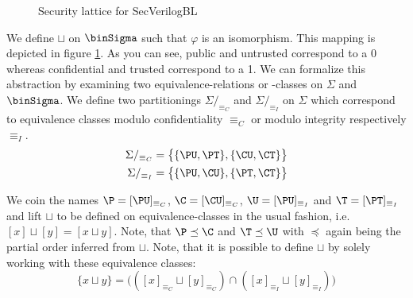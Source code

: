 \begin{figure}
    \centering
    \caption{Security lattice for SecVerilogBL \cite{Ferraiuolo17}}
    \label{fig:sec-lattice}
\end{figure}

We define $ \sqcup $ on $ \binSigma $ such that $ \varphi $ is an isomorphism.
This mapping is depicted in figure \ref{fig:sec-lattice}.
As you can see, public and untrusted correspond to a 0 whereas confidential and trusted correspond to a 1.
We can formalize this abstraction by examining two equivalence-relations or -classes on $ \Sigma $ and $ \binSigma $.
We define two partitionings $ \Sigma/_{\equiv_C} $ and $ \Sigma/_{\equiv_I} $ on $ \Sigma $ which correspond to equivalence classes modulo confidentiality $ \equiv_C $ or modulo integrity respectively $ \equiv_I $.
\begin{align*}
    \Sigma /_{\equiv_C} &= \big\{ \{ \PU, \PT \}, \{ \CU, \CT \} \big\} \\
    \Sigma /_{\equiv_I} &= \big\{ \{ \PU, \CU \}, \{ \PT, \CT \} \big\}
\end{align*}

We coin the names $ \P = [\PU]_{\equiv_C} $, $ \C = [\CU]_{\equiv_C} $, $ \U = [\PU]_{\equiv_I} $ and $ \T = [\PT]_{\equiv_I} $ and lift $ \sqcup $ to be defined on equivalence-classes in the usual fashion, i.e. $ [x] \sqcup [y] = [x \sqcup y] $.
Note, that $ \P \preceq \C $ and $ \T \preceq \U $ with $ \preceq $ again being the partial order inferred from $ \sqcup $.
Note, that it is possible to define $ \sqcup $ by solely working with these equivalence classes:
\begin{equation*}
    \{ x \sqcup y \} = \big(([x]_{\equiv_C} \sqcup [y]_{\equiv_C}) \cap ([x]_{\equiv_I} \sqcup [y]_{\equiv_I}) \big)
\end{equation*}

